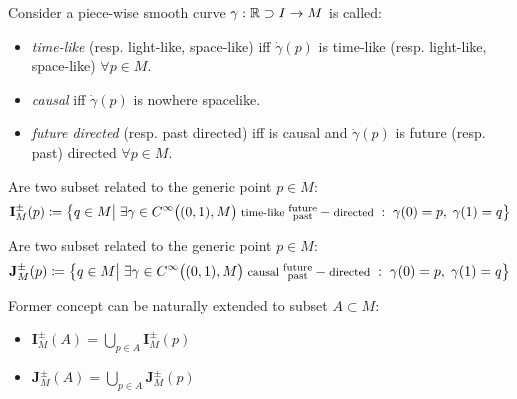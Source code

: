 \documentclass[a4paper,12pt]{scrartcl}    %
\begin{document}
	\begin{notationfix}
		Consider a piece-wise smooth curve $\gamma: \mathbb{R}\supset I \rightarrow M$ is called:
		\begin{itemize}
			\item \emph{time-like} (resp. light-like, space-like) iff $\dot{\gamma}(p)$ is time-like (resp. light-like, space-like) $\forall p \in M$.
			\item \emph{causal} iff $\dot{\gamma}(p)$ is nowhere spacelike.
			\item \emph{future directed} (resp. past directed) iff is causal and  $\dot{\gamma}(p)$ is future (resp. past) directed $\forall p \in M$.
		\end{itemize}
	\end{notationfix}

	\begin{definition}
		Are two subset related to the generic point $p	\in M$:
		\begin{displaymath}
			\mathbf{I}_M^\pm(p) \coloneqq \big\{ q \in M \big\vert \; \exists \gamma \in C^\infty\big((0,1), M\big)\;  \textrm{\footnotesize time-like } \substack{\textrm{future}\\ \textrm{past} } -\textrm{\footnotesize directed }:\; \gamma(0)=p,\; \gamma(1)=q  \big\}
		\end{displaymath}
	\end{definition}
	
	\begin{definition}
		Are two subset related to the generic point $p	\in M$:
		\begin{displaymath}
			\mathbf{J}_M^\pm(p) \coloneqq \big\{ q \in M \big\vert \; \exists \gamma \in C^\infty\big((0,1), M\big)\; \textrm{\footnotesize causal } \substack{\textrm{future}\\ \textrm{past} } -\textrm{\footnotesize directed }:\; \gamma(0)=p,\; \gamma(1)=q  \big\}
		\end{displaymath}		
	\end{definition}

	\begin{notationfix}
		Former concept can be naturally extended to subset $A \subset M$:
			\begin{itemize}
				\item $\mathbf{I}_M^\pm(A) = \bigcup_{p\in A} \mathbf{I}_M^\pm(p) $
				\item $\mathbf{J}_M^\pm(A) = \bigcup_{p\in A} \mathbf{J}_M^\pm(p) $
			\end{itemize}
	\end{notationfix}
\end{document}
